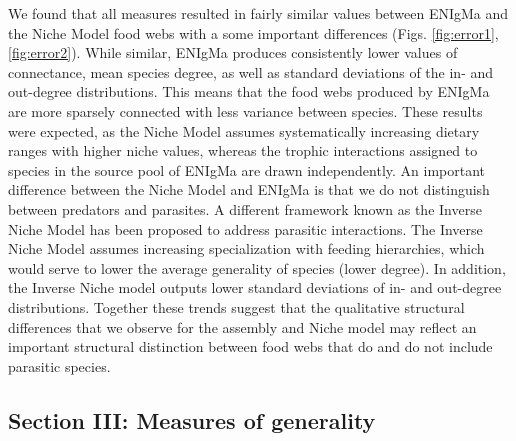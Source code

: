 \documentclass[9pt,twocolumn,twoside]{pnas-new}
\begin{document}
We found that all measures resulted in fairly similar values between ENIgMa and the Niche Model food webs with a some important differences (Figs. \ref{fig:error1},\ref{fig:error2}).
While similar, ENIgMa produces consistently lower values of connectance, mean species degree, as well as standard deviations of the in- and out-degree distributions.
This means that the food webs produced by ENIgMa are more sparsely connected with less variance between species.
These results were expected, as the Niche Model assumes systematically increasing dietary ranges with higher niche values, whereas the trophic interactions assigned to species in the source pool of ENIgMa are drawn independently.
An important difference between the Niche Model and ENIgMa is that we do not distinguish between predators and parasites.
A different framework known as the Inverse Niche Model \cite{Warren2010} has been proposed to address parasitic interactions.
The Inverse Niche Model assumes increasing specialization with feeding hierarchies, which would serve to lower the average generality of species (lower degree).
In addition, the Inverse Niche model outputs lower standard deviations of in- and out-degree distributions.
Together these trends suggest that the qualitative structural differences that we observe for the assembly and Niche model may reflect an important structural distinction between food webs that do and do not include parasitic species.




\subsection*{Section III: Measures of generality}
\end{document}
